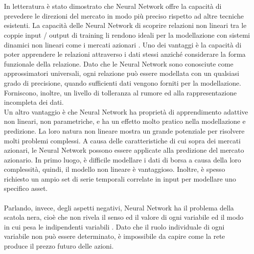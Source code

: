 \documentclass[a4paper,12pt]{report}
\begin{document}
\\~\\In letteratura è stato dimostrato che Neural Network offre la capacità di prevedere le direzioni del mercato in modo più preciso rispetto ad altre tecniche esistenti. La capacità delle Neural Network di scoprire relazioni non lineari tra le coppie input / output di training li rendono ideali per la modellazione con sistemi dinamici non lineari come i mercati azionari \cite{nn1}. Uno dei vantaggi è la capacità di poter apprendere le relazioni attraverso i dati stessi anziché considerare la forma funzionale della relazione. Dato che le Neural Network sono conosciute come approssimatori universali, ogni relazione può essere modellata con un qualsiasi grado di precisione, quando sufficienti dati vengono forniti per la modellazione. Forniscono, inoltre, un livello di tolleranza al rumore ed alla rappresentazione incompleta dei dati.\\
Un altro vantaggio è che Neural Network ha proprietà di apprendimento adattive non lineari, non parametriche, e ha un effetto molto pratico nella modellazione e predizione. La loro natura non lineare mostra un grande potenziale per risolvere molti problemi complessi. A causa delle caratteristiche di cui sopra dei mercati azionari, le Neural Network possono essere applicate alla predizione del mercato azionario. In primo luogo, è difficile modellare i dati di borsa a causa della loro complessità, quindi, il modello non lineare è vantaggioso. Inoltre, è spesso richiesto un ampio set di serie temporali correlate in input per modellare uno specifico asset.\\~\\Parlando, invece, degli aspetti negativi, Neural Network ha il problema della scatola nera, cioè che non rivela il senso ed il valore di ogni variabile ed il modo in cui pesa le indipendenti variabili \cite{nn1}. Dato che il ruolo individuale di ogni variabile non può essere determinato, è impossibile da capire come la rete produce il prezzo futuro delle azioni.\\
\end{document}
